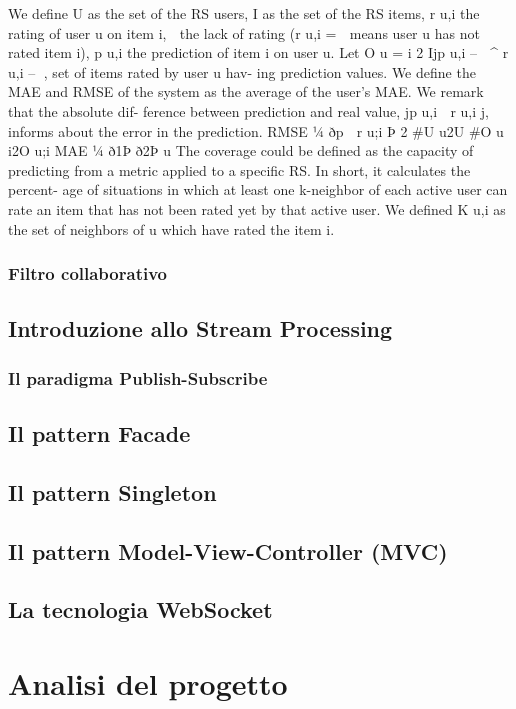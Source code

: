 \documentclass[11pt]{article}
\begin{document}
We define U as the set of the RS users, I as the set of the RS
items, r u,i the rating of user u on item i,  the lack of rating (r u,i = 
means user u has not rated item i), p u,i the prediction of item i on
user u.
Let O u = {i 2 Ijp u,i –  ^ r u,i – }, set of items rated by user u hav-
ing prediction values. We define the MAE and RMSE of the system
as the average of the user’s MAE. We remark that the absolute dif-
ference between prediction and real value, jp u,i  r u,i j, informs
about the error in the prediction. RMSE 1⁄4
ðp  r u;i Þ 2
#U u2U #O u i2O u;i
MAE 1⁄4
ð1Þ
ð2Þ
u
The coverage could be defined as the capacity of predicting from
a metric applied to a specific RS. In short, it calculates the percent-
age of situations in which at least one k-neighbor of each active
user can rate an item that has not been rated yet by that active
user. We defined K u,i as the set of neighbors of u which have rated
the item i.
\subsubsection{Filtro collaborativo}
\subsection{Introduzione allo Stream Processing}
\subsubsection{Il paradigma Publish-Subscribe}
\subsection{Il pattern Facade}
\subsection{Il pattern Singleton}
\subsection{Il pattern Model-View-Controller (MVC)}
\subsection{La tecnologia WebSocket}

\section{Analisi del progetto}
\end{document}
